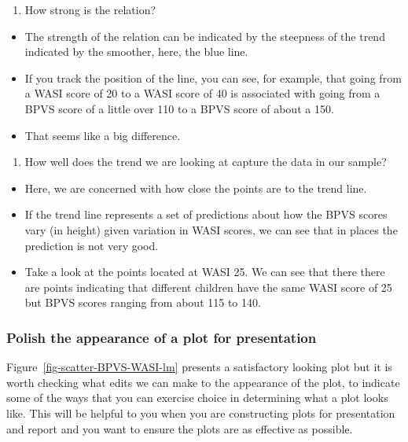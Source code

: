 \documentclass[
  letterpaper,
  DIV=11,
  numbers=noendperiod]{scrreprt}
\providecommand{\tightlist}{%
  \setlength{\itemsep}{0pt}\setlength{\parskip}{0pt}}\usepackage{longtable,booktabs,array}
\begin{document}
\begin{enumerate}
\def\labelenumi{\arabic{enumi}.}
\setcounter{enumi}{1}
\tightlist
\item
  How strong is the relation?
\end{enumerate}

\begin{itemize}
\tightlist
\item
  The strength of the relation can be indicated by the steepness of the
  trend indicated by the smoother, here, the blue line.
\item
  If you track the position of the line, you can see, for example, that
  going from a WASI score of 20 to a WASI score of 40 is associated with
  going from a BPVS score of a little over 110 to a BPVS score of about
  a 150.
\item
  That seems like a big difference.
\end{itemize}

\begin{enumerate}
\def\labelenumi{\arabic{enumi}.}
\setcounter{enumi}{2}
\tightlist
\item
  How well does the trend we are looking at capture the data in our
  sample?
\end{enumerate}

\begin{itemize}
\tightlist
\item
  Here, we are concerned with how close the points are to the trend
  line.
\item
  If the trend line represents a set of predictions about how the BPVS
  scores vary (in height) given variation in WASI scores, we can see
  that in places the prediction is not very good.
\item
  Take a look at the points located at WASI 25. We can see that there
  there are points indicating that different children have the same WASI
  score of 25 but BPVS scores ranging from about 115 to 140.
\end{itemize}

\hypertarget{polish-the-appearance-of-a-plot-for-presentation}{%
\subsubsection{Polish the appearance of a plot for
presentation}\label{polish-the-appearance-of-a-plot-for-presentation}}

Figure~\ref{fig-scatter-BPVS-WASI-lm} presents a satisfactory looking
plot but it is worth checking what edits we can make to the appearance
of the plot, to indicate some of the ways that you can exercise choice
in determining what a plot looks like. This will be helpful to you when
you are constructing plots for presentation and report and you want to
ensure the plots are as effective as possible.
\end{document}
